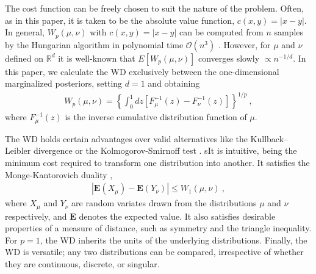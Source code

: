 \documentclass[fleqn,usenatbib,useAMS]{mnras}
\begin{document}
The cost function can be freely chosen to suit the nature of the problem. Often, as in this paper, it is taken to be the absolute value function, $c(x,y) = |x-y|$. In general, $W_p(\mu,\nu)$ with $c(x,y)=|x-y|$ can be computed from $n$ samples by the Hungarian algorithm \citep{Kuhn} in polynomial time $\mathcal{O}(n^3)$ \citep{Villani2009}. However, for $\mu$ and $\nu$ defined on $\mathbb{R}^d$ it is well-known \citep{Dudley} that $E[W_p(\mu,\nu)]$ converges slowly $\propto n^{-1/d}$. In this paper, we calculate the WD exclusively between the one-dimensional marginalized posteriors, setting $d=1$ and obtaining
\begin{eqnarray}
	W_p(\mu,\nu)= \left\{\int_0^1 dz \left[ F_{\mu}^{-1} (z) - F_{\nu}^{-1} (z) \right] \right\}^{1/p} \ , \label{eq:wasserstein}
\end{eqnarray}
where $F_{\mu}^{-1}(z)$ is the inverse cumulative distribution function of $\mu$. \newline  




The WD holds certain advantages over valid alternatives like the Kullback–Leibler divergence or the  Kolmogorov-Smirnoff test \citep{gelman2013bayesian,corder2014nonparametric}. sIt is intuitive, being the minimum cost required to transform one distribution into another. It satisfies the Monge-Kantorovich duality \citep{villani2003topics,Villani2009},
\begin{eqnarray}
	| \boldsymbol{E}(X_{\mu} )-\boldsymbol{E}(Y_{\nu} ) | \leq W_1(\mu, \nu) \ , \label{eq:WDdefn}
\end{eqnarray}
where $X_{\mu}$ and $Y_{\nu}$ are random variates drawn from the distributions $\mu$ and $\nu$ respectively, and $\boldsymbol{E}$ denotes the expected value. It also satisfies desirable properties of a measure of distance, such as symmetry and the triangle inequality. For $p=1$, the WD inherits the units of the underlying distributions. Finally, the WD is versatile; any two distributions can be compared, irrespective of whether they are continuous, discrete, or singular. \newline 
\end{document}
